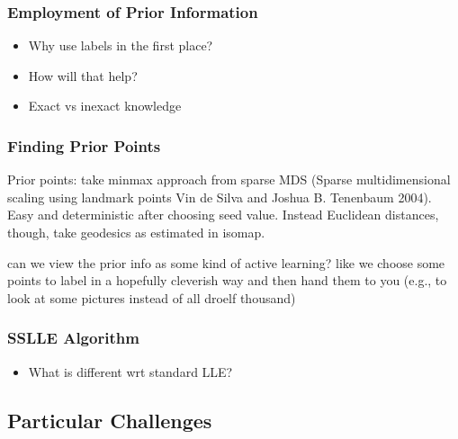 
\subsubsection{Employment of Prior Information}
\label{prior-info}


\begin{itemize}
  \item Why use labels in the first place?
  \item How will that help?
  \item Exact vs inexact knowledge
\end{itemize}


\subsubsection{Finding Prior Points}
\label{prior-points}

Prior points: take minmax approach from sparse MDS (Sparse multidimensional 
scaling using landmark points Vin de Silva and Joshua B. Tenenbaum 2004). 
Easy and deterministic after choosing seed value.
Instead Euclidean distances, though, take geodesics as estimated in isomap.

can we view the prior info as some kind of active learning? like we choose 
some points to label in a hopefully cleverish way and then hand them to you 
(e.g., to look at some pictures instead of all droelf thousand)


\subsubsection{SSLLE Algorithm}
\label{algo-sslle}

\begin{itemize}
  \item What is different wrt standard LLE?
\end{itemize}


\subsection{Particular Challenges}
\label{challenges}

